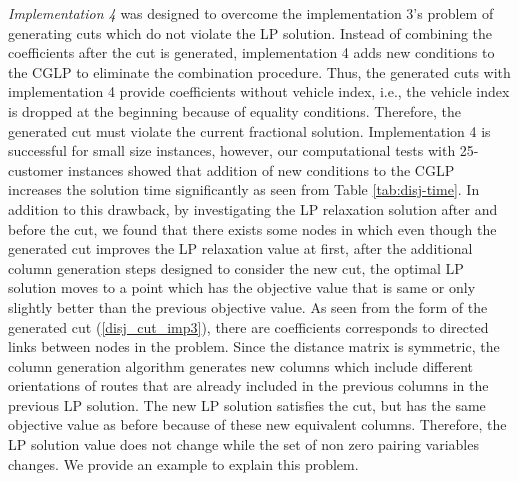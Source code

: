 {\em Implementation 4} was designed to overcome the implementation 3's problem of
generating cuts which do not violate the LP solution. Instead of combining
the coefficients after the cut is generated, implementation 4 adds new conditions
to the CGLP to eliminate the combination procedure. Thus, the generated cuts
with implementation 4 provide coefficients without vehicle index, i.e.,
the vehicle index is dropped at the beginning because of equality conditions.
Therefore, the generated cut must violate the current fractional solution.
Implementation 4 is successful for small size instances, however, our computational
tests with 25-customer instances showed that addition of new conditions to the
CGLP increases the solution time significantly as seen from  Table \ref{tab:disj-time}.
In addition to this drawback, by investigating the LP relaxation solution after
and before the cut, we found that there exists some nodes in which even though the
generated cut improves the LP relaxation value at first, after the additional column
generation steps designed to consider the new cut, the optimal LP solution moves to a
point which has the objective value that is same or only slightly better than the
previous objective value. As seen from the form of the generated cut (\ref{disj_cut_imp3}),
there are coefficients corresponds to directed links between nodes in the problem. Since
the distance matrix is symmetric, the column generation algorithm generates
new columns which include different orientations of routes that are already
included in the previous columns in the previous LP solution. The new LP solution
satisfies the cut, but has the same objective value as before because of these
new equivalent columns. Therefore, the LP solution value does not change while
the set of non zero pairing variables changes. We provide an example to explain this
problem.
